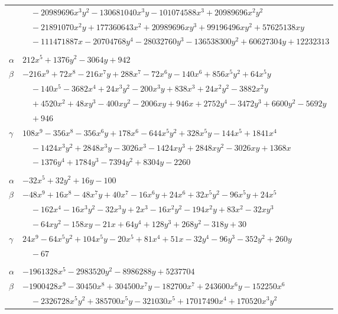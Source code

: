 \documentclass[11pt]{article}
\begin{document}
\begin{longtable}{@{}ll@{}}
 & $\quad -20989696x^{3}y^{2}-130681040x^{3}y-101074588x^{3}+20989696x^{2}y^{2}$\\
 & $\quad -21891070x^{2}y+177360643x^{2}+20989696xy^{3}+99196496xy^{2}+57625138xy$\\
 & $\quad -111471887x-20704768y^{4}-28032760y^{3}-136538300y^{2}+60627304y+12232313$\\
\addlinespace[3pt]
\multicolumn{2}{@{}l}{$\{i,j\}=\{19,37\}$, $k_{ij}=2^{2}$}\\
$\alpha$ & $212x^{5}+1376y^{2}-3064y+942$\\
$\beta$ & $-216x^{9}+72x^{8}-216x^{7}y+288x^{7}-72x^{6}y-140x^{6}+856x^{5}y^{2}+64x^{5}y$\\
 & $\quad -140x^{5}-3682x^{4}+24x^{3}y^{2}-200x^{3}y+838x^{3}+24x^{2}y^{2}-3882x^{2}y$\\
 & $\quad +4520x^{2}+48xy^{3}-400xy^{2}-2006xy+946x+2752y^{4}-3472y^{3}+6600y^{2}-5692y$\\
 & $\quad +946$\\
$\gamma$ & $108x^{9}-356x^{8}-356x^{6}y+178x^{6}-644x^{5}y^{2}+328x^{5}y-144x^{5}+1841x^{4}$\\
 & $\quad -1424x^{3}y^{2}+2848x^{3}y-3026x^{3}-1424xy^{3}+2848xy^{2}-3026xy+1368x$\\
 & $\quad -1376y^{4}+1784y^{3}-7394y^{2}+8304y-2260$\\
\addlinespace[3pt]
\multicolumn{2}{@{}l}{$\{i,j\}=\{19,38\}$, $k_{ij}=3^{2}\cdot 7$}\\
$\alpha$ & $-32x^{5}+32y^{2}+16y-100$\\
$\beta$ & $-48x^{9}+16x^{8}-48x^{7}y+40x^{7}-16x^{6}y+24x^{6}+32x^{5}y^{2}-96x^{5}y+24x^{5}$\\
 & $\quad -162x^{4}-16x^{3}y^{2}-32x^{3}y+2x^{3}-16x^{2}y^{2}-194x^{2}y+83x^{2}-32xy^{3}$\\
 & $\quad -64xy^{2}-158xy-21x+64y^{4}+128y^{3}+268y^{2}-318y+30$\\
$\gamma$ & $24x^{9}-64x^{5}y^{2}+104x^{5}y-20x^{5}+81x^{4}+51x-32y^{4}-96y^{3}-352y^{2}+260y$\\
 & $\quad -67$\\
\addlinespace[3pt]
\multicolumn{2}{@{}l}{$\{i,j\}=\{19,39\}$, $k_{ij}=2\cdot 3^{2}\cdot 5\cdot 11$}\\
$\alpha$ & $-1961328x^{5}-2983520y^{2}-8986288y+5237704$\\
$\beta$ & $-1900428x^{9}-30450x^{8}+304500x^{7}y-182700x^{7}+243600x^{6}y-152250x^{6}$\\
 & $\quad -2326728x^{5}y^{2}+385700x^{5}y-321030x^{5}+17017490x^{4}+170520x^{3}y^{2}$\\

\end{longtable}
\end{document}
